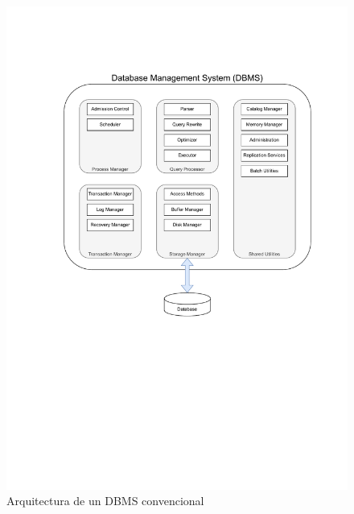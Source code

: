 \begin{figure}[h]
  \centering
  \includegraphics[width=\textwidth, trim=0 310 0 100, clip]{graphs/arq_dbms.pdf}
  \caption{Arquitectura de un DBMS convencional}
\end{figure}

